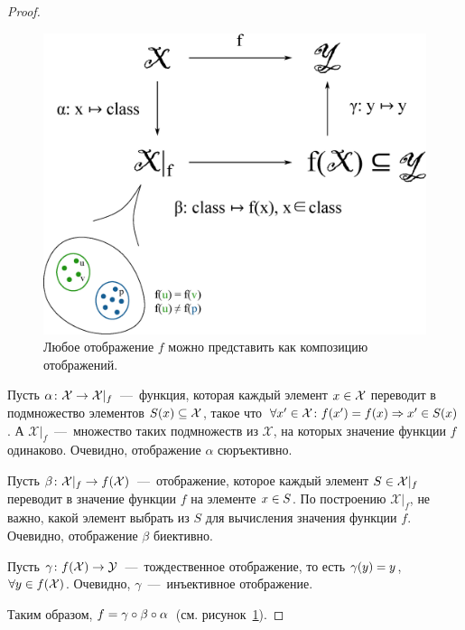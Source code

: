 \documentclass[a4paper,12pt]{article}
\begin{document}
  \begin{proof}
    \begin{figure}
      \centering
      
      \includegraphics[width=0.8\columnwidth]{tribute-to-algebraic-approach}
      
      \caption{Любое отображение $f$ можно представить как композицию отображений.}
      \label{fig:tribute-to-algebraic}
    \end{figure}
    
    Пусть $\alpha\colon \mathcal X \hm\to \mathcal X|_f$~---~функция, которая каждый элемент $x \hm\in \mathcal X$ переводит в подмножество элементов $S(x) \hm\subseteq \mathcal X$, такое что $\forall x' \hm\in \mathcal X\colon f(x') \hm= f(x) \hm\Rightarrow x' \hm\in S(x)$.
    А $\mathcal X|_f$~---~множество таких подмножеств из $\mathcal X$, на которых значение функции $f$ одинаково.
    Очевидно, отображение $\alpha$ сюръективно.
    
    Пусть $\beta\colon \mathcal X|_f \hm\to f(\mathcal X)$~---~отображение, которое каждый элемент $S \hm\in \mathcal X|_f$ переводит в значение функции $f$ на элементе $x \hm\in S$.
    По построению $\mathcal X|_f$, не важно, какой элемент выбрать из $S$ для вычисления значения функции $f$.
    Очевидно, отображение $\beta$ биективно.
    
    Пусть $\gamma\colon f(\mathcal X) \hm\to \mathcal Y$~---~тождественное отображение, то есть $\gamma(y) \hm= y$, $\forall y \hm\in f(\mathcal X)$.
    Очевидно, $\gamma$~---~инъективное отображение.
    
    Таким образом, $f \hm= \gamma \circ \beta \circ \alpha$~(см. рисунок~\ref{fig:tribute-to-algebraic}).
  \end{proof}
  
\end{document}
